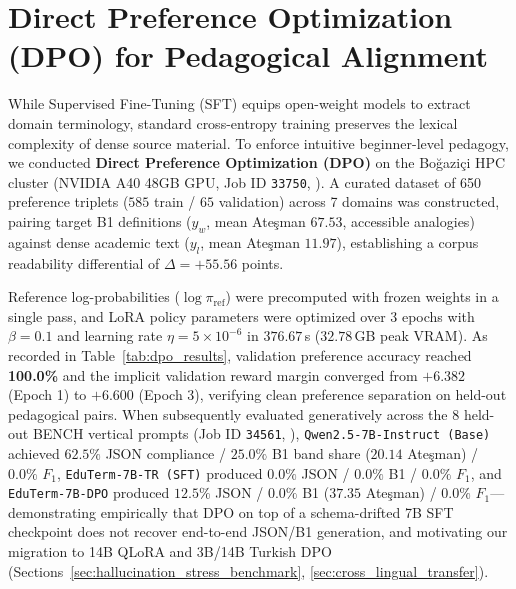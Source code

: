 \documentclass[a4paper,12pt]{report}
\begin{document}
\section{Direct Preference Optimization (DPO) for Pedagogical Alignment}
While Supervised Fine-Tuning (SFT) equips open-weight models to extract domain terminology, standard cross-entropy training preserves the lexical complexity of dense source material. To enforce intuitive beginner-level pedagogy, we conducted \textbf{Direct Preference Optimization (DPO)} on the Bo\u{g}azi\c{c}i HPC cluster (NVIDIA A40 48GB GPU, Job ID \texttt{33750}, ). A curated dataset of 650 preference triplets ($585$ train / $65$ validation) across 7 domains was constructed, pairing target B1 definitions ($y_w$, mean Ate\c{s}man $67.53$, accessible analogies) against dense academic text ($y_l$, mean Ate\c{s}man $11.97$), establishing a corpus readability differential of $\Delta = +55.56$ points.

Reference log-probabilities ($\log \pi_{\text{ref}}$) were precomputed with frozen weights in a single pass, and LoRA policy parameters were optimized over 3 epochs with $\beta = 0.1$ and learning rate $\eta = 5 \times 10^{-6}$ in $376.67$\,s ($32.78$\,GB peak VRAM). As recorded in Table~\ref{tab:dpo_results}, validation preference accuracy reached \textbf{100.0\%} and the implicit validation reward margin converged from $+6.382$ (Epoch 1) to \textbf{$+6.600$} (Epoch 3), verifying clean preference separation on held-out pedagogical pairs. When subsequently evaluated generatively across the 8 held-out BENCH vertical prompts (Job ID \texttt{34561}, ), \texttt{Qwen2.5-7B-Instruct (Base)} achieved $62.5\%$ JSON compliance / $25.0\%$ B1 band share ($20.14$ Ate\c{s}man) / $0.0\%$ $F_1$, \texttt{EduTerm-7B-TR (SFT)} produced $0.0\%$ JSON / $0.0\%$ B1 / $0.0\%$ $F_1$, and \texttt{EduTerm-7B-DPO} produced $12.5\%$ JSON / $0.0\%$ B1 ($37.35$ Ate\c{s}man) / $0.0\%$ $F_1$---demonstrating empirically that DPO on top of a schema-drifted 7B SFT checkpoint does not recover end-to-end JSON/B1 generation, and motivating our migration to 14B QLoRA and 3B/14B Turkish DPO (Sections~\ref{sec:hallucination_stress_benchmark}, \ref{sec:cross_lingual_transfer}).
\end{document}

